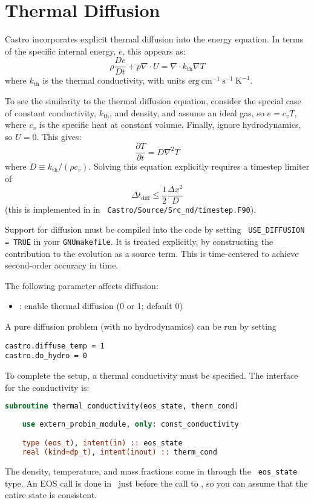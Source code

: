 \label{ch:diffusion}

\section{Thermal Diffusion}

Castro incorporates explicit thermal diffusion into the energy equation.  
In terms of the specific internal energy, $e$, this appears as:
\begin{equation}
\rho \frac{De}{Dt} + p \nabla \cdot U = \nabla \cdot k_\mathrm{th} \nabla T
\end{equation}
where $k_\mathrm{th}$ is the thermal conductivity, with units
$\mathrm{erg~cm^{-1}~s^{-1}~K^{-1}}$.

To see the similarity to the thermal diffusion equation, consider the special
case of constant conductivity, $k_\mathrm{th}$, and density, and assume an
ideal gas, so $e = c_v T$, where $c_v$ is the specific heat at constant volume.
Finally, ignore hydrodynamics, so $U = 0$.  This gives:
\begin{equation}
\frac{\partial T}{\partial t} = D \nabla^2 T
\end{equation}
where $D \equiv k_\mathrm{th}/(\rho c_v)$.  Solving this equation
explicitly requires a timestep limiter of
\begin{equation}
\Delta t_\mathrm{diff} \le \frac{1}{2} \frac{\Delta x^2}{D}
\end{equation}
(this is implemented in  in {\tt
  Castro/Source/Src\_nd/timestep.F90}).

Support for diffusion must be compiled into the code by setting {\tt
  USE\_DIFFUSION = TRUE} in your {\tt GNUmakefile}.  It is treated
explicitly, by constructing the contribution to the evolution as a
source term.  This is time-centered to achieve second-order accuracy
in time.

The following parameter affects diffusion:
\begin{itemize}
\item {}:  enable thermal diffusion (0 or 1; default 0)
\end{itemize}

A pure diffusion problem (with no hydrodynamics) can be run by setting
\begin{verbatim}
castro.diffuse_temp = 1
castro.do_hydro = 0
\end{verbatim}

To complete the setup, a thermal conductivity must be specified.  The
interface for the conductivity is:
\begin{lstlisting}[language=fortran]
  subroutine thermal_conductivity(eos_state, therm_cond)
    
    use extern_probin_module, only: const_conductivity

    type (eos_t), intent(in) :: eos_state
    real (kind=dp_t), intent(inout) :: therm_cond
\end{lstlisting}
The density, temperature, and mass fractions come in through the {\tt
  eos\_state} type.  An EOS call is done in \castro\ just before the
call to , so you can assume that the entire
state is consistent.

